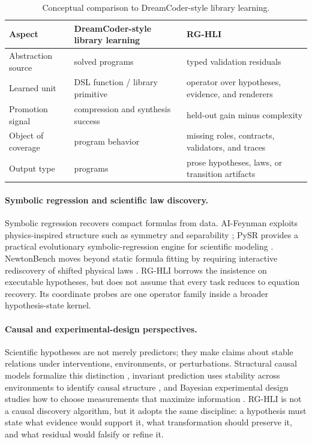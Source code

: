 \documentclass[letterpaper]{article}
\newcommand{\tblhdr}{\rowcolor{headerrow}}
\newcommand{\methodshort}{\textsc{RG-HLI}\xspace}
\begin{document}
\begin{table}[H]
\centering
\caption{Conceptual comparison to DreamCoder-style library learning.}
\label{tab:dreamcoder_compare}
\small
\setlength{\tabcolsep}{4pt}
\begin{tabularx}{\columnwidth}{@{}lYY@{}}
\toprule
\tblhdr
Aspect & DreamCoder-style library learning & \methodshort \\
\midrule
Abstraction source & solved programs & typed validation residuals \\
Learned unit & DSL function / library primitive & operator over hypotheses, evidence, and renderers \\
Promotion signal & compression and synthesis success & held-out gain minus complexity \\
Object of coverage & program behavior & missing roles, contracts, validators, and traces \\
Output type & programs & prose hypotheses, laws, or transition artifacts \\
\bottomrule
\end{tabularx}
\end{table}

\paragraph{Symbolic regression and scientific law discovery.}
Symbolic regression recovers compact formulas from data. AI-Feynman exploits
physics-inspired structure such as symmetry and separability
\citep{aifeynman}; PySR provides a practical evolutionary symbolic-regression
engine for scientific modeling \citep{pysr}. NewtonBench moves beyond static
formula fitting by requiring interactive rediscovery of shifted physical laws
\citep{newtonbench}. \methodshort borrows the insistence on executable hypotheses, but
does not assume that every task reduces to equation recovery. Its coordinate
probes are one operator family inside a broader hypothesis-state kernel.

\paragraph{Causal and experimental-design perspectives.}
Scientific hypotheses are not merely predictors; they make claims about stable
relations under interventions, environments, or perturbations. Structural
causal models formalize this distinction \citep{pearl}, invariant prediction
uses stability across environments to identify causal structure
\citep{invariant}, and Bayesian experimental design studies how to choose
measurements that maximize information \citep{bed}. \methodshort is not a causal
discovery algorithm, but it adopts the same discipline: a hypothesis must state
what evidence would support it, what transformation should preserve it, and
what residual would falsify or refine it.
\end{document}
